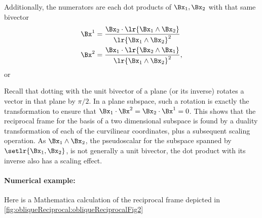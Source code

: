 Additionally, the numerators are each dot products of \( \Bx_1, \Bx_2 \) with that same bivector
\begin{equation}\label{eqn:reciprocal_R2:160}
\begin{aligned}
\Bx^1 &= \frac{\Bx_2 \cdot \lr{ \Bx_1 \wedge \Bx_2 } }{ \lr{ \Bx_1 \wedge \Bx_2}^2 } \\
\Bx^2 &= \frac{\Bx_1 \cdot \lr{ \Bx_2 \wedge \Bx_1 } }{ \lr{ \Bx_1 \wedge \Bx_2}^2 },
\end{aligned}
\end{equation}
or

Recall that dotting with the unit bivector of a plane (or its inverse) rotates a vector in that plane by \( \pi/2 \).
In a plane subspace, such a rotation is exactly the transformation to ensure that \( \Bx_1 \cdot \Bx^2 = \Bx_2 \cdot \Bx^1 = 0 \).
This shows that the reciprocal frame for the basis of a two dimensional subspace is found by a duality transformation of each of the curvilinear coordinates, plus a subsequent scaling operation.
As \( \Bx_1 \wedge \Bx_2 \), the pseudoscalar for the subspace spanned by \( \setlr{ \Bx_1, \Bx_2 } \), is not generally a unit bivector, the dot product with its inverse also has a scaling effect.

\paragraph{Numerical example:}
Here is a Mathematica calculation of the reciprocal frame depicted in \cref{fig:obliqueReciprocal:obliqueReciprocalFig2}

